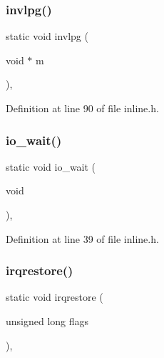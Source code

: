 \subsubsection{\texorpdfstring{invlpg()}{invlpg()}}
{\footnotesize\ttfamily static void invlpg (\begin{DoxyParamCaption}\item[{void $\ast$}]{m }\end{DoxyParamCaption})\hspace{0.3cm}{\ttfamily [inline]}, {\ttfamily [static]}}



Definition at line 90 of file inline.\+h.

\mbox{\label{a00026_a488d1b3600792ee3aac5be4b7e0be16b_a488d1b3600792ee3aac5be4b7e0be16b}} 
\subsubsection{\texorpdfstring{io\+\_\+wait()}{io\_wait()}}
{\footnotesize\ttfamily static void io\+\_\+wait (\begin{DoxyParamCaption}\item[{void}]{ }\end{DoxyParamCaption})\hspace{0.3cm}{\ttfamily [inline]}, {\ttfamily [static]}}



Definition at line 39 of file inline.\+h.

\mbox{\label{a00026_a7dd6b2cd918b8cbca3c8b0381628ca83_a7dd6b2cd918b8cbca3c8b0381628ca83}} 
\subsubsection{\texorpdfstring{irqrestore()}{irqrestore()}}
{\footnotesize\ttfamily static void irqrestore (\begin{DoxyParamCaption}\item[{unsigned long}]{flags }\end{DoxyParamCaption})\hspace{0.3cm}{\ttfamily [inline]}, {\ttfamily [static]}}



